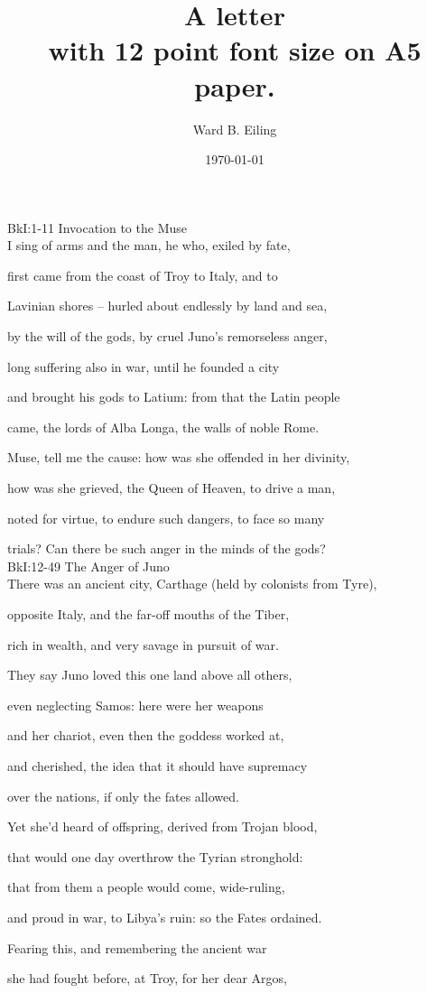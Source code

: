 \documentclass[12pt, a5paper, titlepage]{letter}
\title{A letter \\ \small with 12 point font size on A5 paper.}
\author{Ward B. Eiling}
\date{\today}
\begin{document}
BkI:1-11 Invocation to the Muse \\

I sing of arms and the man, he who, exiled by fate,

first came from the coast of Troy to Italy, and to

Lavinian shores – hurled about endlessly by land and sea,

by the will of the gods, by cruel Juno’s remorseless anger,

long suffering also in war, until he founded a city

and brought his gods to Latium: from that the Latin people

came, the lords of Alba Longa, the walls of noble Rome.

Muse, tell me the cause: how was she offended in her divinity,

how was she grieved, the Queen of Heaven, to drive a man,

noted for virtue, to endure such dangers, to face so many

trials? Can there be such anger in the minds of the gods? \\

BkI:12-49 The Anger of Juno \\

There was an ancient city, Carthage (held by colonists from Tyre),

opposite Italy, and the far-off mouths of the Tiber,

rich in wealth, and very savage in pursuit of war.

They say Juno loved this one land above all others,

even neglecting Samos: here were her weapons

and her chariot, even then the goddess worked at,

and cherished, the idea that it should have supremacy

over the nations, if only the fates allowed.

Yet she’d heard of offspring, derived from Trojan blood,

that would one day overthrow the Tyrian stronghold:

that from them a people would come, wide-ruling,

and proud in war, to Libya’s ruin: so the Fates ordained.

Fearing this, and remembering the ancient war

she had fought before, at Troy, for her dear Argos,
\end{document}
